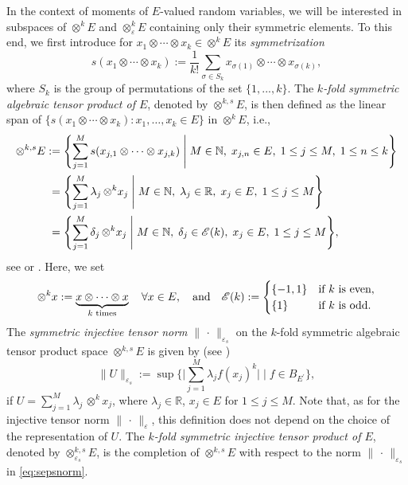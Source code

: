 \documentclass[reqno]{amsart}
\numberwithin{equation}{section}
\newcommand{\bbN}{\mathbb{N}}
\newcommand{\bbR}{\mathbb{R}}
\newcommand{\xk}{\otimes^k}
\newcommand{\xks}{\otimes^{k,s}}
\newcommand{\xkeps}{\otimes^k_\varepsilon}
\newcommand{\xkseps}{\otimes^{k,s}_{\varepsilon_s}}
\newcommand{\tenvec}{U}
\newcommand{\norm}[2]{     \| #1       \|_{ #2 }}
\newcommand{\dual}[1]{{#1}^{\prime}}
\newcommand{\eps}{\varepsilon}
\newcommand{\sym}{s}
\theoremstyle{remark}
\theoremstyle{definition}
\begin{document}
In the context of moments of 
$E$-valued random variables, 
we will be interested in subspaces 
of $\xk E$ and $\xkeps E$ containing  
only their symmetric elements. 
To this end, we first introduce for 
$x_1\otimes\cdots\otimes x_k \in \xk E$ 
its \emph{symmetrization} 
% 
\begin{equation}\label{eq:symmetrization} 
\sym(x_1\otimes \cdots\otimes x_k) 
:= 
\frac{1}{k!} 
\sum_{\sigma\in S_k} 
x_{\sigma(1)} \otimes \cdots \otimes x_{\sigma(k)}, 
\end{equation} 
% 
where 
$S_k$ is the group of permutations 
of the set $\{1, . . . , k\}$.
% 
The \emph{$k$-fold symmetric algebraic tensor product of $E$}, 
denoted by $\xks E$,  
is then defined as the linear span 
of $\{\sym(x_1\otimes \cdots \otimes x_k) : x_1,\ldots,x_k\in E\}$ 
in $\xk E$, i.e., 
%  
\begin{align*} 
\xks E 
&:= 
\Biggl\{
\sum_{j=1}^M 
\sym(x_{j,1} \otimes\cdots\otimes x_{j,k}) 
\; \Bigg| \; 
M\in\bbN,  
\; 
x_{j, n}\in E, 
\; 
1\leq j \leq M, 
\; 
1\leq n \leq k
\Biggr\}
\\
&\textcolor{white}{:}= 
\Biggl\{
\sum_{j=1}^M 
\lambda_j \, {\xk} x_j  
\;\Bigg| \;
M\in\bbN, 
\; 
\lambda_j \in \bbR, 
\; 
x_j \in E, 
\; 
1\leq j\leq M
\Biggr\}
\\
&\textcolor{white}{:}= 
\Biggl\{
\sum_{j=1}^M 
\delta_j \, {\xk} x_j  
\;\Bigg| \;
M\in\bbN, 
\; 
\delta_j \in \mathscr{E}(k), 
\; 
x_j \in E, 
\;  
1\leq j\leq M
\Biggr\}, 
\end{align*} 
% 
see \cite[Section~1.5]{Floret1997} 
or \cite[Section~1.1]{Floret2001}. 
Here, we set 
% 
\[
{\xk} x := \underbrace{x\otimes \cdots \otimes x}_{\normalfont 
	\text{$k$ times}} 
\quad 
\forall x \in E, 
\quad 
\text{and} 
\quad  
\mathscr{E}(k) := 
\begin{cases} 
\{-1,1\} 
&\text{if $k$ is even}, 
\\
\{1\} 
&\text{if $k$ is odd}. 
\end{cases} 
\]
% 
The \emph{symmetric injective tensor norm} 
$\norm{\,\cdot\,}{\eps_s}$ on 
the $k$-fold symmetric algebraic 
tensor product space $\xks E$ 
is given by 
(see \cite[Section~3.1]{Floret1997}) 
% 
\begin{equation}\label{eq:sepsnorm} 
\norm{\tenvec}{\eps_s} 
:= 
\sup\Biggl\{
\biggl| 
\sum_{j=1}^M 
\lambda_j f(x_j)^k
\biggr| 
\; \Bigg| \; 
f\in B_{\dual{E}} 
\Biggr\}, 
\end{equation} 
% 
if $\tenvec=\sum_{j=1}^M \lambda_j \, {\xk} x_j$, 
where $\lambda_j\in\bbR$, $x_j\in E$ 
for $1\leq j \leq M$.  
Note that, 
as for the injective tensor norm $\norm{\,\cdot\,}{\eps}$, 
this definition does 
not depend on the choice of 
the representation of $\tenvec$. 
The \emph{$k$-fold symmetric injective tensor product of $E$}, 
denoted by $\xkseps E$, 
is the completion of $\xks E$ with respect to 
the norm $\norm{\,\cdot\,}{\eps_s}$ in \eqref{eq:sepsnorm}. 
\end{document}
